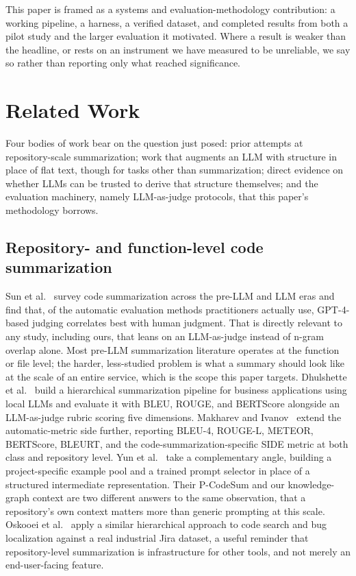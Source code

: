 \documentclass[conference]{IEEEtran}
\begin{document}
This paper is framed as a systems and evaluation-methodology contribution: a working pipeline,
a harness, a verified dataset, and completed results from both a pilot study and the larger
evaluation it motivated. Where a result is weaker than the headline, or rests on an instrument
we have measured to be unreliable, we say so rather than reporting only what reached
significance.

\section{Related Work}
\label{sec:related}


Four bodies of work bear on the question just posed: prior attempts at repository-scale
summarization; work that augments an LLM with structure in place of flat text, though for tasks
other than summarization; direct evidence on whether LLMs can be trusted to derive that
structure themselves; and the evaluation machinery, namely LLM-as-judge protocols, that this
paper's methodology borrows.

\subsection{Repository- and function-level code summarization}
Sun et al.~\cite{sun2024source} survey code summarization across the pre-LLM and LLM eras and
find that, of the automatic evaluation methods practitioners actually use, GPT-4-based judging
correlates best with human judgment. That is directly relevant to any study, including ours,
that leans on an LLM-as-judge instead of n-gram overlap alone. Most pre-LLM summarization
literature operates at the function or file level; the harder, less-studied problem is what a
summary should look like at the scale of an entire service, which is the scope this paper
targets. Dhulshette et al.~\cite{dhulshette2025hierarchical} build a hierarchical summarization
pipeline for business applications using local LLMs and evaluate it with BLEU, ROUGE, and
BERTScore alongside an LLM-as-judge rubric scoring five dimensions. Makharev and
Ivanov~\cite{makharev2025beyond} extend the automatic-metric side further, reporting BLEU-4,
ROUGE-L, METEOR, BERTScore, BLEURT, and the code-summarization-specific SIDE metric at both
class and repository level. Yun et al.~\cite{yun2024projectspecific} take a complementary angle,
building a project-specific example pool and a trained prompt selector in place of a structured
intermediate representation. Their P-CodeSum and our knowledge-graph context are two different
answers to the same observation, that a repository's own context matters more than generic
prompting at this scale. Oskooei et al.~\cite{oskooei2025repositorylevel} apply a similar
hierarchical approach to code search and bug localization against a real industrial Jira
dataset, a useful reminder that repository-level summarization is infrastructure for other
tools, and not merely an end-user-facing feature.
\end{document}
